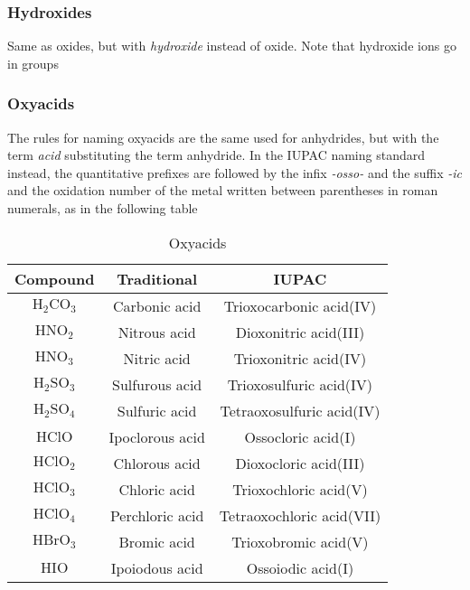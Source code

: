 \documentclass[../qm.tex]{subfiles}
\begin{document}
\subsubsection{Hydroxides}
Same as oxides, but with \textit{hydroxide} instead of oxide. Note that hydroxide ions go in groups
\subsubsection{Oxyacids}
The rules for naming oxyacids are the same used for anhydrides, but with the term \textit{acid} substituting the term anhydride. In the IUPAC naming standard instead, the quantitative prefixes are followed by the infix \textit{-osso-} and the suffix \textit{-ic} and the oxidation number of the metal written between parentheses in roman numerals, as in the following table
\begin{table}[H]
	\centering
	\begin{tabular}{c|c|c}
		Compound&Traditional&IUPAC\\\hline
		$\mathrm{H_2CO_3}$&Carbonic acid&Trioxocarbonic acid(IV)\\\hline
		$\mathrm{HNO_2}$&Nitrous acid&Dioxonitric acid(III)\\\hline
		$\mathrm{HNO_3}$&Nitric acid&Trioxonitric acid(IV)\\\hline
		$\mathrm{H_2SO_3}$&Sulfurous acid&Trioxosulfuric acid(IV)\\\hline
		$\mathrm{H_2SO_4}$&Sulfuric acid&Tetraoxosulfuric acid(IV)\\\hline
		$\mathrm{HClO}$&Ipoclorous acid&Ossocloric acid(I)\\\hline
		$\mathrm{HClO_2}$&Chlorous acid&Dioxocloric acid(III)\\\hline
		$\mathrm{HClO_3}$&Chloric acid&Trioxochloric acid(V)\\\hline
		$\mathrm{HClO_4}$&Perchloric acid&Tetraoxochloric acid(VII)\\\hline
		$\mathrm{HBrO_3}$&Bromic acid&Trioxobromic acid(V)\\\hline
		$\mathrm{HIO}$&Ipoiodous acid&Ossoiodic acid(I)\\\hline
	\end{tabular}
	\caption{Oxyacids}
	\label{tab:oxyacids.chem}
\end{table}
\end{document}
